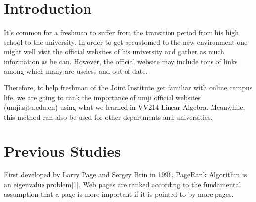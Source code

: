 \documentclass[a0,portrait]{a0poster}
\begin{document}
\begin{multicols}{2} %







\color{Navy} 
\section*{Introduction}
 \paragraph{}
    It's common for a freshman to suffer from the transition period from his high school to the university. In order to get accustomed to the new environment one might well visit the official websites of his university and gather as much information as he can. However, the official website may include tons of links among which many are useless and out of date.
 
    Therefore, to help freshman of the Joint Institute get familiar with online campus life, we are going to rank the importance of umji official websites (umji.sjtu.edu.cn) using what we learned in VV214 Linear Algebra. Meanwhile, this method can also be used for other departments and universities.

\color{SaddleBrown} %


\section*{Previous Studies}

\paragraph{}
    First developed by Larry Page and Sergey Brin in 1996, PageRank Algorithm is an eigenvalue problem[1]. 
    Web pages are ranked according to the fundamental assumption that a page is more important if it is pointed to by more pages.
    

\end{multicols}
\end{document}
